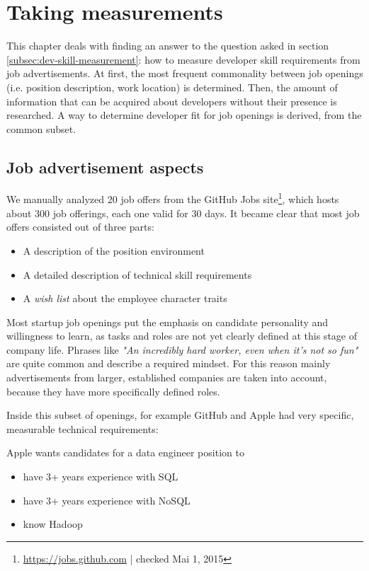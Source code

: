 \chapter{Taking measurements}
This chapter deals with finding an answer to the question asked in section \ref{subsec:dev-skill-measurement}: how to measure developer skill requirements from job advertisements.
At first, the most frequent commonality between job openings (i.e.  position description, work location) is determined. Then, the amount of information that can be acquired about developers without their presence is researched. A way to determine developer fit for job openings is derived, from the common subset.

\section{Job advertisement aspects}
We manually analyzed 20 job offers from the GitHub Jobs site\footnote{\url{https://jobs.github.com} | checked Mai 1, 2015}, which hosts about 300 job offerings, each one valid for 30 days. It became clear that most job offers consisted out of three parts:

\begin{itemize}
  \item A description of the position environment
  \item A detailed description of technical skill requirements
  \item A \textit{wish list} about the employee character traits
\end{itemize}

Most startup job openings put the emphasis on candidate personality and willingness to learn, as tasks and roles are not yet clearly defined at this stage of company life. Phrases like \textit{"An incredibly hard worker, even when it's not so fun"} are quite common and describe a required mindset. For this reason mainly advertisements from larger, established  companies are taken into account, because they have more specifically defined roles.

Inside this subset of openings, for example GitHub and Apple had very specific, measurable technical requirements:
\newline

Apple wants candidates for a data engineer position to
\begin{itemize}
    \item have 3+ years experience with SQL
    \item have 3+ years experience with NoSQL
    \item know Hadoop
\end{itemize}

